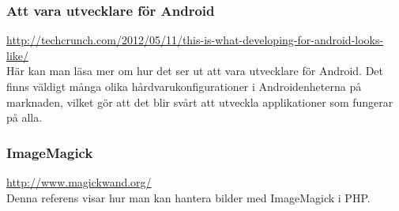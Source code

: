 \subsubsection{Att vara utvecklare för Android}
\url{http://techcrunch.com/2012/05/11/this-is-what-developing-for-android-looks-like/} \\
Här kan man läsa mer om hur det ser ut att vara utvecklare för Android. Det finns väldigt många olika hårdvarukonfigurationer i Androidenheterna på marknaden, vilket gör att det blir svårt att utveckla applikationer som fungerar på alla.

\subsubsection{ImageMagick}
\url{http://www.magickwand.org/} \\
Denna referens visar hur man kan hantera bilder med ImageMagick i PHP.
